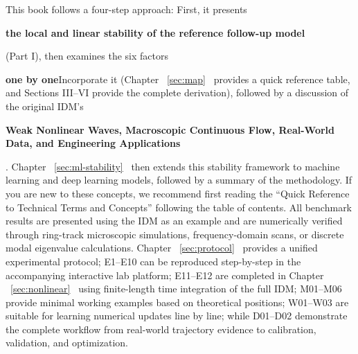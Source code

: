 \documentclass[11pt,a4paper,openany]{book}
\numberwithin{equation}{chapter}
\numberwithin{figure}{chapter}
\numberwithin{table}{chapter}
\begin{document}
This book follows a four-step approach: First, it presents




\textbf{the local and linear stability of the reference follow-up model}




(Part I), then examines the six factors




\textbf{one by one}Incorporate it (Chapter ~\ref{sec:map}~ provides a quick reference table, and Sections III–VI provide the complete derivation), followed by a discussion of the original IDM’s




\textbf{Weak Nonlinear Waves, Macroscopic Continuous Flow, Real-World Data, and Engineering Applications}




. Chapter ~\ref{sec:ml-stability}~ then extends this stability framework to machine learning and deep learning models, followed by a summary of the methodology. If you are new to these concepts, we recommend first reading the “Quick Reference to Technical Terms and Concepts” following the table of contents. All benchmark results are presented using the IDM as an example and are numerically verified through ring-track microscopic simulations, frequency-domain scans, or discrete modal eigenvalue calculations. Chapter ~\ref{sec:protocol}~ provides a unified experimental protocol; E1–E10 can be reproduced step-by-step in the accompanying interactive lab platform; E11–E12 are completed in Chapter ~\ref{sec:nonlinear}~ using finite-length time integration of the full IDM; M01–M06 provide minimal working examples based on theoretical positions; W01–W03 are suitable for learning numerical updates line by line; while D01–D02 demonstrate the complete workflow from real-world trajectory evidence to calibration, validation, and optimization.
\end{document}
